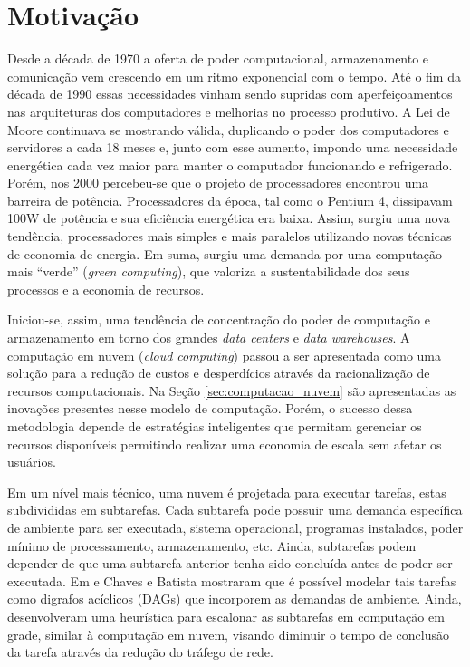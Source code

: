 \section{Motivação}
\label{sec:motivacao}
Desde a década de 1970 a oferta de poder computacional, armazenamento e
comunicação vem crescendo em um ritmo exponencial com o tempo. Até o fim da
década de 1990 essas necessidades vinham sendo supridas com aperfeiçoamentos nas
arquiteturas dos computadores e melhorias no processo produtivo. A Lei de Moore
continuava se mostrando válida, duplicando o poder dos computadores e servidores
a cada 18 meses e, junto com esse aumento, impondo uma necessidade energética
cada vez maior para manter o computador funcionando e refrigerado. Porém, 
nos 2000 percebeu-se que o projeto de processadores encontrou uma
barreira de potência. Processadores da época, tal como o Pentium 4, dissipavam
100W de potência e sua eficiência energética era baixa. \cite{patterson:computer_organization}
Assim, surgiu uma nova tendência, processadores mais simples e mais paralelos
utilizando novas técnicas de economia de energia. Em suma, surgiu uma demanda
por uma computação mais ``verde'' (\emph{green computing}), que valoriza a
sustentabilidade dos seus processos e a economia de recursos.

Iniciou-se, assim, uma tendência de concentração do poder de computação e 
armazenamento em torno dos grandes \emph{data centers} e \emph{data warehouses}.
A computação em nuvem (\emph{cloud computing}) passou a ser apresentada como
uma solução para a redução de custos e desperdícios através da
racionalização de recursos computacionais. Na Seção \ref{sec:computacao_nuvem}
são apresentadas as inovações presentes nesse modelo de computação. Porém, o 
sucesso dessa metodologia depende de estratégias inteligentes que permitam 
gerenciar os recursos disponíveis permitindo realizar uma economia de escala
sem afetar os usuários.

Em um nível mais técnico, uma nuvem é projetada para executar tarefas, estas
subdivididas em subtarefas. Cada subtarefa pode possuir uma demanda específica
de ambiente para ser executada, sistema operacional, programas instalados, poder
mínimo de processamento, armazenamento, etc. Ainda, subtarefas podem depender de
que uma subtarefa anterior tenha sido concluída antes de poder ser executada. Em
\cite{chaves:scheduling_software_requirements} e 
\cite{batista:embedding_software_requirements} Chaves e Batista mostraram que é 
possível modelar tais tarefas como digrafos acíclicos (DAGs) que incorporem as
demandas de ambiente. Ainda, desenvolveram uma heurística para escalonar as
subtarefas em computação em grade, similar à computação
em nuvem, visando diminuir o tempo de conclusão da tarefa através da redução
do tráfego de rede.


